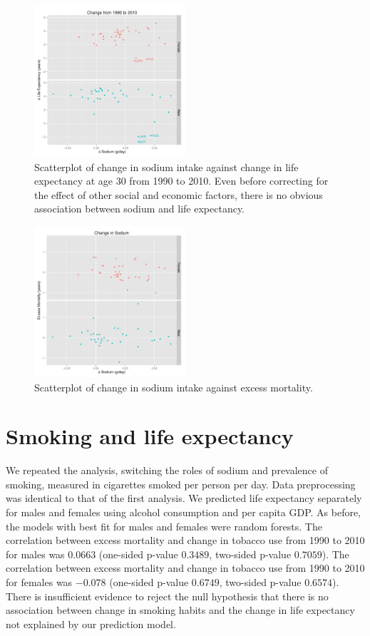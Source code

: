 \documentclass{article}
\begin{document}
\begin{figure}
\centering
\includegraphics[width = 0.5\textwidth]{sodium_lifeexp.pdf}
\caption{Scatterplot of change in sodium intake against change in life expectancy at age 30 from 1990 to 2010. Even before correcting for the effect of other social and economic factors, there is no obvious association between sodium and life expectancy.}\label{fig:sodium_lifeexp}
\end{figure}

\begin{figure}
\centering
\includegraphics[width = 0.5\textwidth]{sodium_exmort.pdf}
\caption{Scatterplot of change in sodium intake against excess mortality.}\label{fig:sodium_excessmortality}
\end{figure}


\clearpage
\section{Smoking and life expectancy}
We repeated the analysis, switching the roles of sodium and prevalence of smoking, measured in cigarettes smoked per person per day.  Data preprocessing was identical to that of the first analysis.  We predicted life expectancy separately for males and females using alcohol consumption and per capita GDP.  As before, the models with best fit for males and females were random forests.  The correlation between excess mortality and change in tobacco use from 1990 to 2010 for males was $0.0663$ (one-sided p-value $0.3489$, two-sided p-value $0.7059$).  The correlation between excess mortality and change in tobacco use from 1990 to 2010 for females was $-0.078$ (one-sided p-value $0.6749$, two-sided p-value $0.6574$).  There is insufficient evidence to reject the null hypothesis that there is no association between change in smoking habits and the change in life expectancy not explained by our prediction model.
\end{document}
